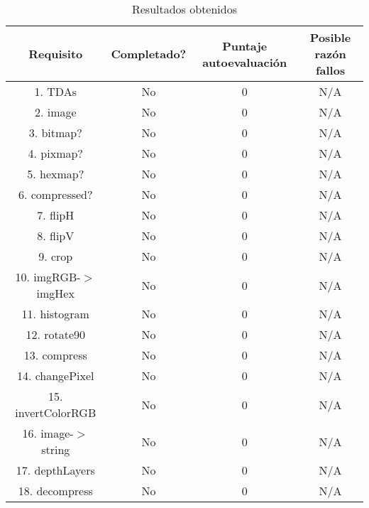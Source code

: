 \begin{table}[H]
    \begin{center}
    \begin{tabular}{| c | c | c | c |}
    \hline
    Requisito & Completado? & Puntaje autoevaluación & Posible razón fallos \\ \hline \hline
    1. TDAs & No & 0 & N/A \\ \hline
    2. image & No & 0 & N/A \\ \hline
    3. bitmap? & No & 0 & N/A \\ \hline
    4. pixmap? & No & 0 & N/A \\ \hline
    5. hexmap? & No & 0 & N/A \\ \hline
    6. compressed? & No & 0 & N/A \\ \hline
    7. flipH & No & 0 & N/A \\ \hline
    8. flipV & No & 0 & N/A \\ \hline
    9. crop & No & 0 & N/A \\ \hline
    10. imgRGB-$>$imgHex & No & 0 & N/A \\ \hline
    11. histogram & No & 0 & N/A \\ \hline
    12. rotate90 & No & 0 & N/A \\ \hline
    13. compress & No & 0 & N/A \\ \hline
    14. changePixel & No & 0 & N/A \\ \hline
    15. invertColorRGB & No & 0 & N/A \\ \hline
    16. image-$>$string & No & 0 & N/A \\ \hline
    17. depthLayers & No & 0 & N/A \\  \hline
    18. decompress & No & 0 & N/A \\ \hline
    \end{tabular}
    \caption{Resultados obtenidos}
    \label{tab:Resultados}
    \end{center}
\end{table}